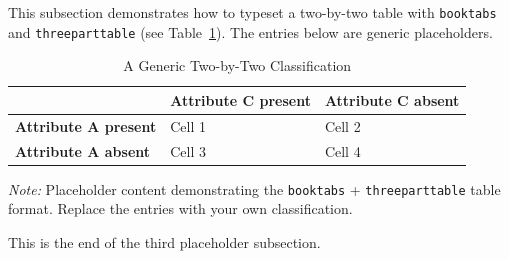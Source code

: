
This subsection demonstrates how to typeset a two-by-two table with
\texttt{booktabs} and \texttt{threeparttable} (see Table~\ref{tab:example-2x2}).
The entries below are generic placeholders.

\begin{table}[htbp]
  \centering
  \caption{A Generic Two-by-Two Classification}
  \label{tab:example-2x2}
  \begin{tabular}{p{3.2cm} p{4.6cm} p{4.6cm}}
    \toprule
    & \textbf{Attribute C present} & \textbf{Attribute C absent} \\
    \midrule
    \textbf{Attribute A present} & Cell 1 & Cell 2 \\
    \addlinespace
    \textbf{Attribute A absent}  & Cell 3 & Cell 4 \\
    \bottomrule
  \end{tabular}
  \begin{tablenotes}
    \footnotesize
    \item \textit{Note:} Placeholder content demonstrating the
    \texttt{booktabs} + \texttt{threeparttable} table format. Replace the
    entries with your own classification.
  \end{tablenotes}
\end{table}

This is the end of the third placeholder subsection.
